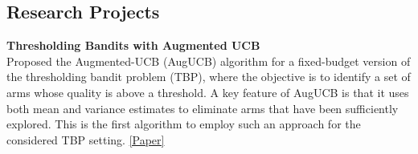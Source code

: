 \documentclass[margin,11pt]{res}
\begin{document}
\begin{resume}
%



\section{Research Projects}
\par 

\textbf{Thresholding Bandits with Augmented UCB}\\
Proposed the Augmented-UCB (AugUCB) algorithm for a fixed-budget version of the thresholding bandit problem (TBP), where the objective is to identify a set of arms whose quality is above a threshold. A key feature of AugUCB is that it uses both mean and variance estimates to eliminate arms that have been sufficiently explored. This is the first algorithm to employ such an approach for the considered TBP setting. \href{https://www.ijcai.org/proceedings/2017/0350.pdf}{[Paper]}
\par


\end{resume}
\end{document}
